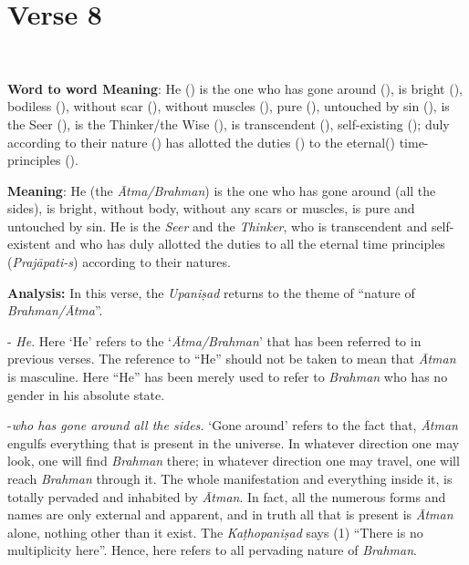 \chapter{Verse 8}

\begin{moolashloka}
\\
\end{moolashloka}

\textbf{Word to word Meaning}: He () is the one who has gone around (), is bright (), bodiless (), without scar (), without muscles (), pure (), untouched by sin (), is the Seer (), is the Thinker/the Wise (), is transcendent (), self-existing (); duly according to their nature () has allotted the duties () to the eternal() time-principles ().

\textbf{Meaning}: He (the \emph{Ātma/Brahman}) is the one who has gone around (all the sides), is bright, without body, without any scars or muscles, is pure and untouched by sin. He is the \emph{Seer} and the \emph{Thinker}, who is transcendent and self-existent and who has duly allotted the duties to all the eternal time principles (\emph{Prajāpati-s}) according to their natures.

\textbf{Analysis:} In this verse, the \emph{Upaniṣad} returns to the theme of ``nature of \emph{Brahman/Ātma}''.

- \emph{He}. Here `He' refers to the `\emph{Ātma/Brahman}' that has been referred to in previous verses. The reference to ``He'' should not be taken to mean that \emph{Ātman} is masculine. Here ``He'' has been merely used to refer to \emph{Brahman} who has no gender in his absolute state.

-\emph{who has gone around all the sides.} `Gone around' refers to the fact that, \emph{Ātman} engulfs everything that is present in the universe. In whatever direction one may look, one will find \emph{Brahman} there; in whatever direction one may travel, one will reach \emph{Brahman} through it. The whole manifestation and everything inside it, is totally pervaded and inhabited by \emph{Ātman}. In fact, all the numerous forms and names are only external and apparent, and in truth all that is present is \emph{Ātman} alone, nothing other than it exist. The \emph{Kaṭhopaniṣad} says (1) ``There is no multiplicity here''. Hence, here  refers to all pervading nature of \emph{Brahman}.

